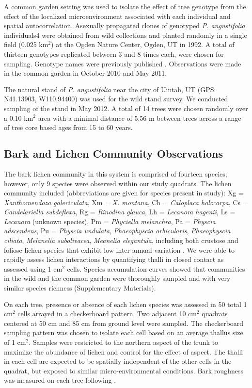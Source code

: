 \documentclass[fleqn,10pt]{wlscirep}
\begin{document}
A common garden setting was used to isolate the effect of tree
genotype from the effect of the localized microenvironment associated
with each individual and spatial autocorrelation. Asexually propagated
clones of genotyped \textit{P. angustifolia} individuals4 were
obtained from wild collections and planted randomly in a single field
(0.025 km$^2$) at the Ogden Nature Center, Ogden, UT in 1992. A total
of thirteen genotypes replicated between 3 and 8 times each, were
chosen for sampling. Genotype names were previously published
\cite{Ellison2005}. Observations were made in the common garden in
October 2010 and May 2011.

The natural stand of \textit{P. angustifolia} near the city of Uintah,
UT (GPS:  N41.13903, W110.94400) was used for the wild stand
survey. We conducted sampling of the stand in May 2012. A total of 14
trees were chosen randomly over a 0.10 km$^2$ area with a minimal
distance of 5.56 m between trees across a range of tree core based
ages from 15 to 60 years.

\subsection*{Bark and Lichen Community Observations}

The bark lichen community in this system is comprised of fourteen
species; however, only 9 species were observed within our study
quadrats. The lichen community included (abbreviations are given for
species present in study): Xg = \textit{Xanthomendoza galericulata},
Xm = \textit{X. montana}, Ch = \textit{Caloplaca holocarpa}, Cs =
\textit{Candelariella subdeflexa}, Rg = \textit{Rinodina glauca}, Lh =
\textit{Lecanora hagenii}, Ls = \textit{Lecanora} (unknown species),
Pm = \textit{Phyciella melanchra}, Pa = \textit{Physcia adscendens},
Pu = \textit{Physcia undulata}, \textit{Phaeophyscia orbicularis},
\textit{Phaeophyscia ciliata}, \textit{Melanelia subolivacea},
\textit{Meanelia elegantula}, including both crustose and foliose
lichen species that exhibit low inter-annual variation
\cite{Ellison2005}. We were able to rapidly assess lichen interactions
by quantifying thalli in closed contact as assessed using 1 cm$^2$
cells. Species accumulation curves showed that communities in the wild
and the common garden were thoroughly sampled and with very similar
species richness (Supplementary Materials). 

On each tree, presence or absence of each lichen species was assessed
in 50 total 1 cm$^2$ cells arrayed in a checkerboard pattern. Two
adjacent 10 cm$^2$ quadrats centered at 50 cm and 85 cm from ground
level were sampled. The checkerboard sampling pattern was chosen to
isolate each cell based on an average thallus size of 1
cm$^2$. Samples were restricted to the northern aspect of the trunk to
maximize the abundance of lichen and control for the effect of
aspect. The thalli in each cell are expected to be spatially
independent of the other cells in the quadrat, but exposed to similar
micro-environmental conditions. Bark roughness was measured on each
tree following \cite{Winfree2011}.
\end{document}
